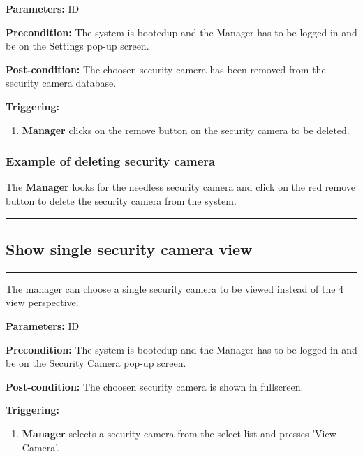 \begin{description}

\item \textbf{Parameters:} ID
\item \textbf{Precondition:} The system is bootedup and the Manager has to be
logged in and be on the Settings pop-up screen.
\item \textbf{Post-condition:} The choosen security camera has been removed from the security camera database.
\item \textbf{Triggering:}
\begin{enumerate}

\item \textbf{Manager} clicks on the remove button on the security camera to be deleted.

\end{enumerate}
\end{description}

\subsubsection{Example of deleting security camera}
The \textbf{Manager} looks for the needless security camera and click on the red remove button to delete the security camera from the system.
\hfill
\vspace{0.5cm}
\hrule





\subsection{Show single security camera view}
\hrule
\hfill
\vspace{0.5cm}
\label{operation:Show single security camera view}

The manager can choose a single security camera to be viewed instead of the 4 view perspective.

\begin{description}

\item \textbf{Parameters:} ID
\item \textbf{Precondition:} The system is bootedup and the Manager has to be
logged in and be on the Security Camera pop-up screen.
\item \textbf{Post-condition:} The choosen security camera is shown in fullscreen.
\item \textbf{Triggering:}
\begin{enumerate}

\item \textbf{Manager} selects a security camera from the select list and presses 'View Camera'.

\end{enumerate}
\end{description}

